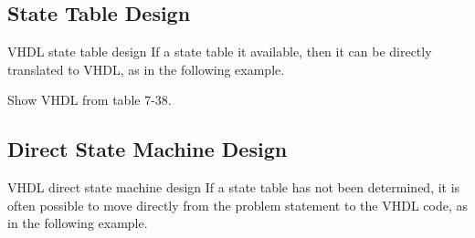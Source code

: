 \subsection{State Table Design}

\begin{frame}{VHDL state table design}
  If a state table it available, then it can be directly translated to VHDL, as in the following example.
\end{frame}

Show VHDL from table 7-38.

\subsection{Direct State Machine Design}

\begin{frame}{VHDL direct state machine design}
  If a state table has not been determined, it is often possible to move directly from the problem statement to the VHDL code, as in the following example.
\end{frame}


